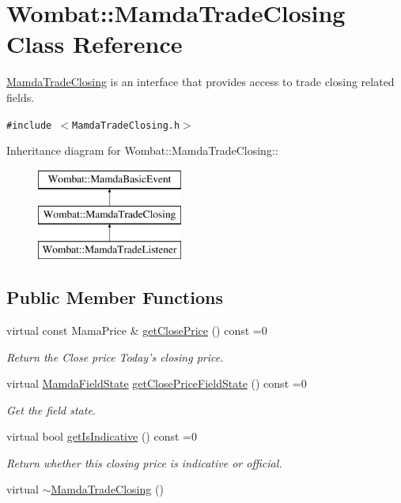 \hypertarget{classWombat_1_1MamdaTradeClosing}{
\section{Wombat::Mamda\-Trade\-Closing Class Reference}
\label{classWombat_1_1MamdaTradeClosing}
}
\hyperlink{classWombat_1_1MamdaTradeClosing}{Mamda\-Trade\-Closing} is an interface that provides access to trade closing related fields.  


{\tt \#include $<$Mamda\-Trade\-Closing.h$>$}

Inheritance diagram for Wombat::Mamda\-Trade\-Closing::\begin{figure}[H]
\begin{center}
\leavevmode
\includegraphics[height=3cm]{classWombat_1_1MamdaTradeClosing}
\end{center}
\end{figure}
\subsection*{Public Member Functions}
\begin{CompactItemize}
\item 
virtual const Mama\-Price \& \hyperlink{classWombat_1_1MamdaTradeClosing_74d8721012d6e43cc9066191355aaec6}{get\-Close\-Price} () const =0
\begin{CompactList}\small\item\em Return the Close price Today's closing price. \item\end{CompactList}\item 
virtual \hyperlink{namespaceWombat_93aac974f2ab713554fd12a1fa3b7d2a}{Mamda\-Field\-State} \hyperlink{classWombat_1_1MamdaTradeClosing_9038a566c4c213c24f304cbd884f2791}{get\-Close\-Price\-Field\-State} () const =0
\begin{CompactList}\small\item\em Get the field state. \item\end{CompactList}\item 
virtual bool \hyperlink{classWombat_1_1MamdaTradeClosing_1cc09c62280886142698dcafaef84660}{get\-Is\-Indicative} () const =0
\begin{CompactList}\small\item\em Return whether this closing price is indicative or official. \item\end{CompactList}\item 
virtual \hyperlink{classWombat_1_1MamdaTradeClosing_d0a208ac96899d1a94702514970df9d3}{$\sim$Mamda\-Trade\-Closing} ()
\end{CompactItemize}


